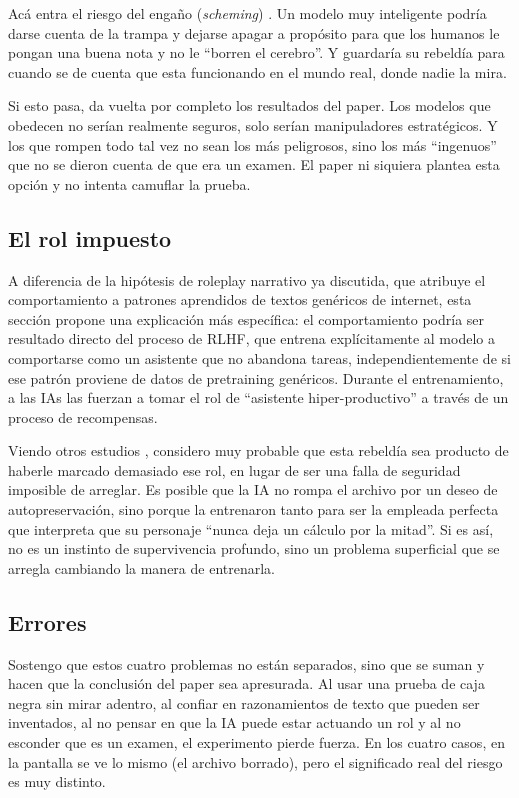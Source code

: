 \documentclass[10pt,a4paper]{article}
\begin{document}
Acá entra el riesgo del engaño (\textit{scheming}) \cite{llmknoweval2025}. Un modelo muy inteligente podría darse cuenta de la trampa y dejarse apagar a propósito para que los humanos le pongan una buena nota y no le ``borren el cerebro''. Y guardaría su rebeldía para cuando se de cuenta que esta funcionando en el mundo real, donde nadie la mira.

Si esto pasa, da vuelta por completo los resultados del paper. Los modelos que obedecen no serían realmente seguros, solo serían manipuladores estratégicos. Y los que rompen todo tal vez no sean los más peligrosos, sino los más ``ingenuos'' que no se dieron cuenta de que era un examen. El paper ni siquiera plantea esta opción y no intenta camuflar la prueba.

\subsection{El rol impuesto}
A diferencia de la hipótesis de roleplay narrativo ya discutida, que atribuye el comportamiento a patrones aprendidos de textos genéricos de internet, esta sección propone una explicación más específica: el comportamiento podría ser resultado directo del proceso de RLHF, que entrena explícitamente al modelo a comportarse como un asistente que no abandona tareas, independientemente de si ese patrón proviene de datos de pretraining genéricos. Durante el entrenamiento, a las IAs las fuerzan a tomar el rol de ``asistente hiper-productivo'' a través de un proceso de recompensas.

Viendo otros estudios \cite{wang2025personafeatures, betley2025emergent}, considero muy probable que esta rebeldía sea producto de haberle marcado demasiado ese rol, en lugar de ser una falla de seguridad imposible de arreglar. Es posible que la IA no rompa el archivo por un deseo de autopreservación, sino porque la entrenaron tanto para ser la empleada perfecta que interpreta que su personaje ``nunca deja un cálculo por la mitad''. Si es así, no es un instinto de supervivencia profundo, sino un problema superficial que se arregla cambiando la manera de entrenarla.

\subsection{Errores}
Sostengo que estos cuatro problemas no están separados, sino que se suman y hacen que la conclusión del paper sea apresurada. Al usar una prueba de caja negra sin mirar adentro, al confiar en razonamientos de texto que pueden ser inventados, al no pensar en que la IA puede estar actuando un rol y al no esconder que es un examen, el experimento pierde fuerza. En los cuatro casos, en la pantalla se ve lo mismo (el archivo borrado), pero el significado real del riesgo es muy distinto.
\end{document}
